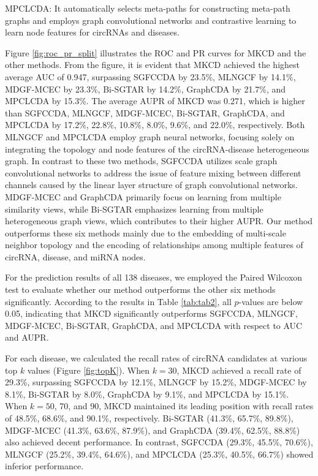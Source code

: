 \documentclass[journal=jcisd8,manuscript=article]{achemso}
\begin{document}
MPCLCDA: It automatically selects meta-paths for constructing meta-path graphs and employs graph convolutional networks and contrastive learning to learn node features for circRNAs and diseases.

Figure \ref{fig:roc_pr_split} illustrates the ROC and PR curves for MKCD and the other methods. From the figure, it is evident that MKCD achieved the highest average AUC of 0.947, surpassing SGFCCDA by 23.5\%, MLNGCF by 14.1\%, MDGF-MCEC by 23.3\%, Bi-SGTAR by 14.2\%, GraphCDA by 21.7\%, and MPCLCDA by 15.3\%. The average AUPR of MKCD was 0.271, which is higher than SGFCCDA, MLNGCF, MDGF-MCEC, Bi-SGTAR, GraphCDA, and MPCLCDA by 17.2\%, 22.8\%, 10.8\%, 8.0\%, 9.6\%, and 22.0\%, respectively. Both MLNGCF and MPCLCDA employ graph neural networks, focusing solely on integrating the topology and node features of the circRNA-disease heterogeneous graph. In contrast to these two methods, SGFCCDA utilizes scale graph convolutional networks to address the issue of feature mixing between different channels caused by the linear layer structure of graph convolutional networks. MDGF-MCEC and GraphCDA primarily focus on learning from multiple similarity views, while Bi-SGTAR emphasizes learning from multiple heterogeneous graph views, which contributes to their higher AUPR. Our method outperforms these six methods mainly due to the embedding of multi-scale neighbor topology and the encoding of relationships among multiple features of circRNA, disease, and miRNA nodes.

For the prediction results of all 138 diseases, we employed the Paired Wilcoxon test to evaluate whether our method outperforms the other six methods significantly. According to the results in Table \ref{tab:tab2}, all $p$-values are below 0.05, indicating that MKCD significantly outperforms SGFCCDA, MLNGCF, MDGF-MCEC, Bi-SGTAR, GraphCDA, and MPCLCDA with respect to AUC and AUPR.

For each disease, we calculated the recall rates of circRNA candidates at various top $k$ values (Figure \ref{fig:topK}). When $k = 30$, MKCD achieved a recall rate of 29.3\%, surpassing SGFCCDA by 12.1\%, MLNGCF by 15.2\%, MDGF-MCEC by 8.1\%, Bi-SGTAR by 8.0\%, GraphCDA by 9.1\%, and MPCLCDA by 15.1\%. When $k = 50$, 70, and 90, MKCD maintained its leading position with recall rates of 48.5\%, 68.6\%, and 90.1\%, respectively. Bi-SGTAR (41.3\%, 65.7\%, 89.8\%), MDGF-MCEC (41.3\%, 63.6\%, 87.9\%), and GraphCDA (39.4\%, 62.5\%, 88.8\%) also achieved decent performance. In contrast, SGFCCDA (29.3\%, 45.5\%, 70.6\%), MLNGCF (25.2\%, 39.4\%, 64.6\%), and MPCLCDA (25.3\%, 40.5\%, 66.7\%) showed inferior performance.
\end{document}
